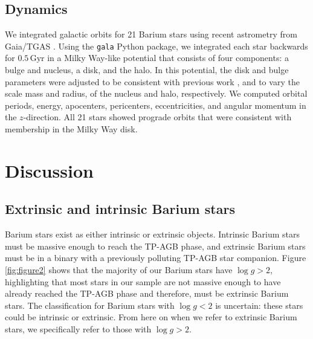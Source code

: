 \documentclass[a4paper,fleqn,usenatbib]{mnras}
\begin{document}
\subsection{Dynamics}
We integrated galactic orbits for 21 Barium stars using recent astrometry from Gaia/TGAS \citep{gaia2016a,gaia2016b}. Using the \texttt{gala} Python package, we integrated each star backwards for $0.5\,\textrm{Gyr}$ in a Milky Way-like potential that consists of four components: a \citet{hernquist1990} bulge and nucleus, a \citet{miyamoto1975} disk, and the \citet{nfw1997} halo. In this potential, the disk and bulge parameters were adjusted to be consistent with previous work \citep{bovy2015}, and to vary the scale mass and radius, of the nucleus and halo, respectively. We computed orbital periods, energy, apocenters, pericenters, eccentricities, and angular momentum in the $z$-direction. All 21 stars showed prograde orbits that were consistent with membership in the Milky Way disk.

\section{Discussion}  \label{sec:dis}


\subsection{Extrinsic and intrinsic Barium stars}
Barium stars exist as either intrinsic or extrinsic objects. Intrinsic Barium stars must be massive enough to reach the TP-AGB phase, and extrinsic Barium stars must be in a binary with a previously polluting TP-AGB star companion. Figure \ref{fig:figure2} shows that the majority of our Barium stars have $\log{g} > 2$, highlighting that most stars in our sample are not massive enough to have already reached the TP-AGB phase and therefore, must be extrinsic Barium stars. The classification for Barium stars with $\log{g} < 2$ is uncertain: these stars could be intrinsic or extrinsic. From here on when we refer to extrinsic Barium stars, we specifically refer to those with $\log{g} > 2$.
\end{document}
